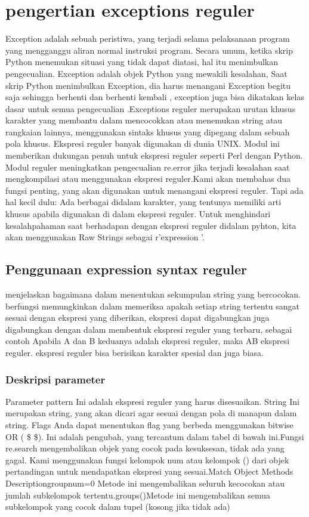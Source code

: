 \section {pengertian exceptions reguler}
Exception adalah sebuah peristiwa, yang terjadi selama pelaksanaan program yang mengganggu aliran normal instruksi program. Secara umum, ketika skrip Python menemukan situasi yang tidak dapat diatasi, hal itu menimbulkan pengecualian. Exception adalah objek Python yang mewakili kesalahan, Saat  skrip Python menimbulkan Exception, dia harus menangani Exception begitu saja sehingga berhenti dan berhenti kembali , exception juga bisa dikatakan kelas dasar untuk semua pengecualian .Exceptions reguler merupakan urutan khusus karakter yang membantu dalam mencocokkan atau menemukan string atau rangkaian lainnya, menggunakan sintaks khusus yang dipegang dalam sebuah pola khusus. Ekspresi reguler banyak digunakan di dunia UNIX. Modul ini memberikan dukungan penuh untuk ekspresi reguler seperti Perl dengan Python. Modul reguler meningkatkan pengecualian re.error jika terjadi kesalahan saat mengkompilasi atau menggunakan ekspresi reguler.Kami akan membahas dua fungsi penting, yang akan digunakan untuk menangani ekspresi reguler. Tapi ada hal kecil dulu: Ada berbagai didalam karakter, yang tentunya memiliki arti khusus apabila digunakan di dalam ekspresi reguler. Untuk menghindari kesalahpahaman  saat berhadapan dengan ekspresi reguler didalam pyhton, kita akan menggunakan Raw Strings sebagai r'expression '.

\subsection {Penggunaan expression syntax reguler}
menjelaskan bagaimana dalam menentukan sekumpulan string yang bercocokan. berfungsi memungkinkan dalam memeriksa apakah setiap string
tertentu sangat sesuai dengan ekspresi yang diberikan, ekspresi dapat digabungkan juga digabungkan dengan dalam membentuk ekspresi reguler yang terbaru, sebagai contoh Apabila A dan B  keduanya adalah ekspresi reguler, maka AB ekspresi reguler. ekspresi reguler 
bisa berisikan karakter spesial dan juga biasa.

\subsubsection {Deskripsi parameter}
Parameter pattern Ini adalah ekspresi reguler yang harus disesuaikan. String Ini merupakan string, yang akan dicari agar sesuai dengan pola di manapun dalam string. Flags Anda dapat menentukan flag yang berbeda menggunakan bitwise OR ( \$  \vert  \$). Ini adalah pengubah, yang tercantum dalam tabel di bawah ini.Fungsi re.search mengembalikan objek yang cocok pada kesuksesan, tidak ada yang gagal. Kami menggunakan fungsi kelompok {num} atau kelompok () dari objek pertandingan untuk mendapatkan ekspresi yang sesuai.Match Object Methods Descriptiongroup{num=0} Metode ini mengembalikan seluruh kecocokan atau jumlah subkelompok tertentu.groups()Metode ini mengembalikan semua subkelompok yang cocok dalam tupel (kosong jika tidak ada) 

